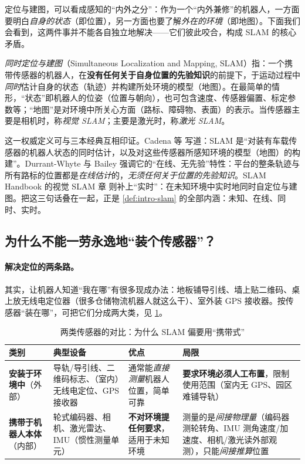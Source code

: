 \noindent 定位与建图，可以看成感知的“内外之分”：作为一个“内外兼修”的机器人，一方面要明白\emph{自身的状态}（即位置），另一方面也要了解\emph{外在的环境}（即地图）。下面我们会看到，这两件事并不能各自独立地解决——它们彼此咬合，构成 SLAM 的核心矛盾。

\begin{definition}\label{def:intro-slam}
\emph{同时定位与建图}（Simultaneous Localization and Mapping, SLAM）指：一个携带传感器的机器人，在\textbf{没有任何关于自身位置的先验知识}的前提下，于运动过程中\emph{同时}估计自身的状态（轨迹）并构建所处环境的模型（地图）\cite{cadena2016past,durrantwhyte2006slam}。在最简单的情形，“状态”即机器人的位姿（位置与朝向），也可包含速度、传感器偏置、标定参数等；“地图”是对环境中所关心方面（路标、障碍物、表面）的表示。当传感器主要是相机时，称\emph{视觉 SLAM}；主要是激光时，称\emph{激光 SLAM}。
\end{definition}

\noindent 这一权威定义可与三本经典互相印证。Cadena 等\cite{cadena2016past} 写道：SLAM 是“对装有车载传感器的机器人状态的同时估计，以及对这些传感器所感知环境的模型（地图）的构建”。Durrant-Whyte 与 Bailey\cite{durrantwhyte2006slam} 强调它的“在线、无先验”特性：平台的整条轨迹与所有路标的位置都是\emph{在线估计}的，\emph{无须任何关于位置的先验知识}。SLAM Handbook 的视觉 SLAM 章\cite{carlone2026handbook} 则补上“实时”：在未知环境中实时地同时自定位与建图。把这三句话叠在一起，正是 \cref{def:intro-slam} 的全部内涵：未知、在线、同时、实时。

\subsection{为什么不能一劳永逸地“装个传感器”？}
\label{sec:intro-sensors}

\paragraph{解决定位的两条路。}
其实，让机器人知道“我在哪”有很多现成办法：地板铺导引线、墙上贴二维码、桌上放无线电定位器（很多仓储物流机器人就这么干）、室外装 GPS 接收器。按传感器“装在哪”，可把它们分成两大类\cite{gaoxiang2019slam14}，见 \cref{tab:intro-sensors}。

\begin{table}[H]\centering\small
\caption{两类传感器的对比：为什么 SLAM 偏要用“携带式”}
\label{tab:intro-sensors}
\begin{tabular}{p{} p{} p{} p{}}
\toprule
类别 & 典型设备 & 优点 & 局限 \\
\midrule
\textbf{安装于环境中}（外部） & 导轨/导引线、二维码标志、（室内）无线电定位、GPS 接收器 & 通常能\emph{直接测量}机器人位置，简单可靠 & \textbf{要求环境必须人工布置}，限制使用范围（室内无 GPS、园区难铺导轨） \\
\textbf{携带于机器人本体}（内部） & 轮式编码器、相机、激光雷达、IMU（惯性测量单元） & \textbf{不对环境提任何要求}，适用于未知环境 & 测量的是\emph{间接物理量}（编码器测轮转角、IMU 测角速度/加速度、相机/激光读外部观测），只能\emph{间接推算}位置 \\
\bottomrule
\end{tabular}
\end{table}

